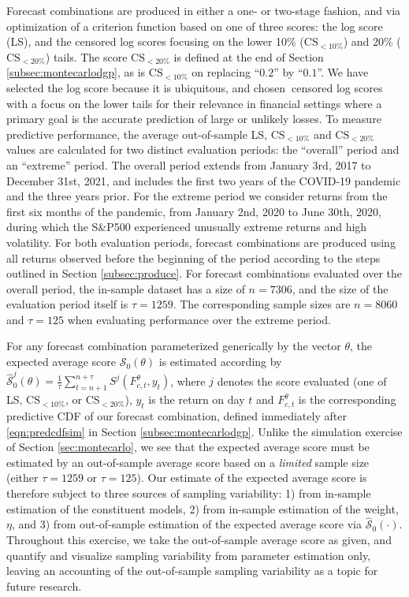 \documentclass[12pt]{article}
\theoremstyle{definition}
\theoremstyle{remark}
\begin{document}
Forecast combinations are produced in either a one- or two-stage fashion, and via optimization of a criterion function based on one of three scores: the log score (LS), and the censored log scores focusing on the lower 10\% ($\mathrm{CS}_{<10\%}$) and 20\% ($\mathrm{CS}_{<20\%}$) tails. The score $\mathrm{CS}_{<20\%}$ is defined at the end of Section \ref{subsec:montecarlodgp}, as is $\mathrm{CS}_{<10\%}$ on replacing ``$0.2$'' by ``$0.1$''. We have selected the log score because it is ubiquitous, and chosen\textbf{\ }censored log scores with a focus on the lower tails for their relevance in financial settings where a primary goal is the accurate prediction of large or unlikely losses. To measure predictive performance, the average out-of-sample LS, $\mathrm{CS}_{<10\%}$ and $\mathrm{CS}_{<20\%}$ values are calculated for two distinct evaluation periods: the ``overall'' period and an ``extreme'' period. The overall period extends from January 3rd, 2017 to December 31st, 2021, and includes the first two years of the COVID-19 pandemic and the three years prior. For the extreme period we consider returns from the first six months of the pandemic, from January 2nd, 2020 to June 30th, 2020, during which the S\&P500 experienced unusually extreme returns and high volatility. For both evaluation periods, forecast combinations are produced using all returns observed before the beginning of the period according to the steps outlined in Section \ref{subsec:produce}. For forecast combinations evaluated over the overall period, the in-sample dataset has a size of $n=7306$, and the size of the evaluation period itself is $\tau = 1259$. The corresponding sample sizes are $n = 8060$ and $\tau = 125$ when evaluating performance over the extreme period.

For any forecast combination parameterized generically by the vector $\theta$, the expected average score $\mathcal{S}_{0}(\theta)$ is estimated according by $\hat{\mathcal{S}}_{0}^{j}(\theta) = \frac{1}{\tau} \sum_{t = n+1}^{n + \tau} S^{j}(F_{c,t}^{\theta}, y_{t})$, where $j$ denotes the score evaluated (one of LS, $\mathrm{CS}_{<10\%}$, or $\mathrm{CS}_{<20\%}$), $y_{t}$ is the return on day $t$ and $F_{c,t}^{\theta}$ is the corresponding predictive CDF of our forecast combination, defined immediately after \eqref{eqn:predcdfsim} in Section \ref{subsec:montecarlodgp}. Unlike the simulation exercise of Section \ref{sec:montecarlo}, we see that the expected average score must be estimated by an out-of-sample average score based on a \textit{limited} sample size (either $\tau =1259$ or $\tau =125$). Our estimate of the expected average score is therefore subject to three sources of sampling variability: 1) from in-sample estimation of the constituent models, 2) from in-sample estimation of the weight, $\eta $, and 3) from out-of-sample estimation of the expected average score via $\hat{\mathcal{S}}_{0}(\cdot)$. Throughout this exercise, we take the out-of-sample average score as given, and quantify and visualize sampling variability from parameter estimation only, leaving an accounting of the out-of-sample sampling variability as a topic for future research.
\end{document}
